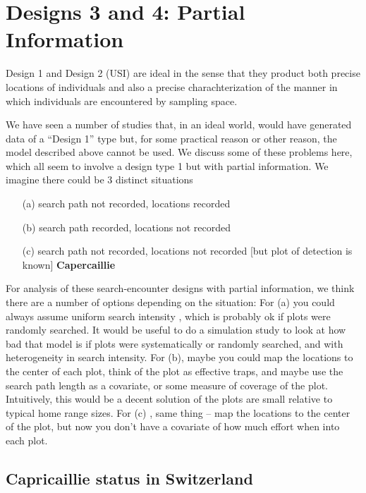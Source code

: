 \section{Designs 3 and 4: Partial Information}


Design 1 and Design 2 (USI) are ideal in the sense that they product
both precise locations of individuals and also a precise
charachterization of the manner in which individuals are encountered
by sampling space. 

We have seen a number of studies that, in an ideal world, would have
generated data of a ``Design
1'' type but, for some practical reason or other reason, the model described
above cannot be used.
 We discuss some of these problems here, which all seem to involve a
 design type 1 but with partial information. We imagine there could be
 3 distinct situations
\begin{itemize}
\item[(a)] search path not recorded, locations recorded
\item[(b)] search path recorded, locations not recorded
\item[(c)] search path not recorded, locations not recorded [but plot of
detection is known]  {\bf Capercaillie}
\end{itemize}

For analysis of these search-encounter designs with partial information,
we think there are a number of options depending on the situation:
For (a) you could always assume uniform search intensity ,
which is probably ok if plots were randomly searched.
It would be useful to do a simulation study to look at how bad that
model is if plots were systematically or randomly searched, and with
heterogeneity in search intensity.
For (b), maybe you could map the locations to the center of each plot,
think of the plot as effective traps, and maybe use the search path
length as a covariate, or some measure of coverage of the
plot. Intuitively, this would be a decent solution of the plots are
small relative to typical home range sizes.
For (c) , same thing -- map the locations to the center of the plot,
but now you don't have a covariate of how much effort when into each
plot.


\subsection{Capricaillie status in Switzerland}


